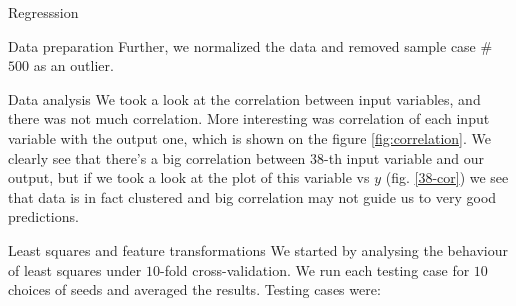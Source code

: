 \documentclass{article}
\begin{document}
\begin{section}{Regresssion}
\begin{subsection}{Data preparation}
Further, we normalized the data and removed sample case \#$500$ as an outlier.
\end{subsection}
\begin{subsection}{Data analysis}
We took a look at the correlation between input variables, and there was not much correlation. More interesting was correlation of each input variable with the output one, which is shown on the figure \ref{fig:correlation}. We clearly see that there's a big correlation between $38$-th input variable and our output, but if we took a look at the plot of this variable vs $y$ (fig. \ref{38-cor}) we see that data is in fact clustered and big correlation may not guide us to very good predictions.
\begin{figure}[!h]
\center
{}
\hfill
{}
\caption{}
\end{figure}
\end{subsection}
\begin{subsection}{Least squares and feature transformations}
We started by analysing the behaviour of least squares under $10$-fold cross-validation. We run each testing case for $10$ choices of seeds and averaged the results. Testing cases were:

\end{subsection}
\end{section}
\end{document}
